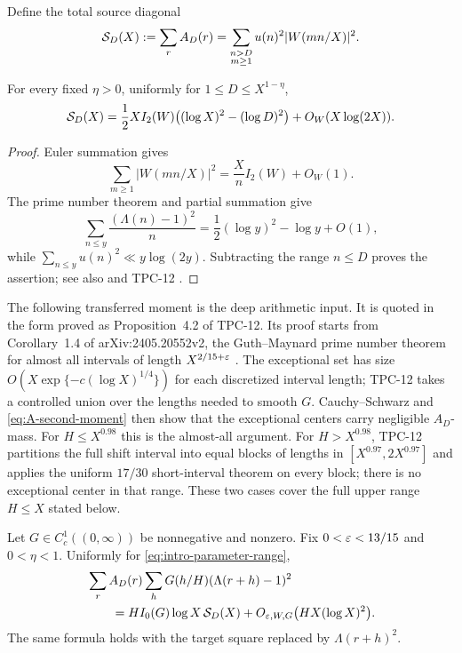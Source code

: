 Define the total source diagonal
\begin{equation}
 \mathcal S_D(X):=\sum_rA_D(r)
 =\sum_{\substack{n>D\\m\geq1}}
 u(n)^2|W(mn/X)|^2.
 \label{eq:source-diagonal-definition}
\end{equation}

\begin{lemma}
\label{lem:source-diagonal}
For every fixed $\eta>0$, uniformly for
$1\leq D\leq X^{1-\eta}$,
\begin{equation}
 \mathcal S_D(X)
 =\frac12XI_2(W)
 \bigl((\log X)^2-(\log D)^2\bigr)
 +O_W(X\log(2X)).
 \label{eq:source-diagonal}
\end{equation}
\end{lemma}

\begin{proof}
Euler summation gives
\[
 \sum_{m\geq1}|W(mn/X)|^2
 =\frac XnI_2(W)+O_W(1).
\]
The prime number theorem and partial summation give
\[
 \sum_{n\leq y}\frac{(\Lambda(n)-1)^2}{n}
 =\frac12(\log y)^2-\log y+O(1),
\]
while $\sum_{n\leq y}u(n)^2\ll y\log(2y)$.  Subtracting the range
$n\leq D$ proves the assertion; see also
\citet[Chapter~5]{IwaniecKowalski2004} and TPC-12
\citep{WangTPC12}.
\end{proof}

The following transferred moment is the deep arithmetic input.  It is
quoted in the form proved as Proposition~4.2 of TPC-12.  Its proof starts
from Corollary~1.4 of arXiv:2405.20552v2, the Guth--Maynard prime number
theorem for almost all intervals of length
$X^{2/15+\varepsilon}$ \citep{GuthMaynard2026}.  The exceptional set has size
$O(X\exp\{-c(\log X)^{1/4}\})$ for each discretized interval length;
TPC-12 takes a controlled union over the lengths needed to smooth $G$.
Cauchy--Schwarz and \eqref{eq:A-second-moment} then show that the
exceptional centers carry negligible $A_D$-mass.
For $H\leq X^{0.98}$ this is the almost-all argument.  For
$H>X^{0.98}$, TPC-12 partitions the full shift interval into equal
blocks of lengths in $[X^{0.97},2X^{0.97}]$ and applies the uniform
$17/30$ short-interval theorem on every block; there is no exceptional
center in that range.  These two cases cover the full upper range
$H\leq X$ stated below.

\begin{proposition}
\label{prop:weighted-target-square}
Let $G\in C_c^1((0,\infty))$ be nonnegative and nonzero.  Fix
$0<\varepsilon<13/15$ and $0<\eta<1$.  Uniformly for
\eqref{eq:intro-parameter-range},
\begin{equation}
 \begin{aligned}
 &\sum_rA_D(r)
 \sum_hG(h/H)(\Lambda(r+h)-1)^2\\
 &\qquad={}
 HI_0(G)\log X\,\mathcal S_D(X)
 +O_{\varepsilon,W,G}\bigl(HX(\log X)^2\bigr).
 \end{aligned}
 \label{eq:weighted-centered-target-square}
\end{equation}
The same formula holds with the target square replaced by
$\Lambda(r+h)^2$.
\end{proposition}

